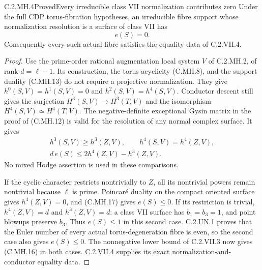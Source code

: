 \begin{statement}{C.2.MH.4}{Proved}{Every irreducible class VII normalization contributes zero}
Under the full CDP torus-fibration hypotheses, an
irreducible fibre support whose normalization resolution
is a surface of class VII has
\[
                              e(S)=0.
 \tag{C.MH.16}
\]
Consequently every such actual fibre satisfies the
equality data of C.2.VII.4.
\end{statement}
\begin{proof}
Use the prime-order rational augmentation local system
$V$ of C.2.MH.2, of rank $d=\ell-1$. Its construction,
the torus acyclicity (C.MH.8), and the support duality
(C.MH.13) do not require a projective normalization.
They give $h^0(S,V)=h^1(S,V)=0$ and
$h^2(S,V)=h^4(S,V)$. Conductor descent still gives the
surjection $H^3(S,V)\to H^3(T,V)$ and the isomorphism
$H^4(S,V)\simeq H^4(T,V)$. The negative-definite
exceptional Gysin matrix in the proof of (C.MH.12)
is valid for the resolution of any normal complex
surface. It gives
\[
 \begin{gathered}
 h^3(S,V)\ge h^3(Z,V),\qquad h^4(S,V)=h^4(Z,V),\\
 d\,e(S)\le 2h^4(Z,V)-h^3(Z,V).
 \end{gathered}
 \tag{C.MH.17}
\]
No mixed Hodge assertion is used in these comparisons.

If the cyclic character restricts nontrivially to $Z$,
all its nontrivial powers remain nontrivial because
$\ell$ is prime. Poincar\'e duality on the compact
oriented surface gives $h^4(Z,V)=0$, and (C.MH.17)
gives $e(S)\le0$. If its restriction is trivial,
$h^4(Z,V)=d$ and $h^3(Z,V)=d$: a class VII surface
has $b_1=b_3=1$, and point blowups preserve $b_3$.
Thus $e(S)\le1$ in this second case. C.2.UN.1 proves
that the Euler number of every actual torus-degeneration
fibre is even, so the second case also gives
$e(S)\le0$. The nonnegative lower bound of C.2.VII.3
now gives (C.MH.16) in both cases. C.2.VII.4 supplies
its exact normalization-and-conductor equality data.
\end{proof}



